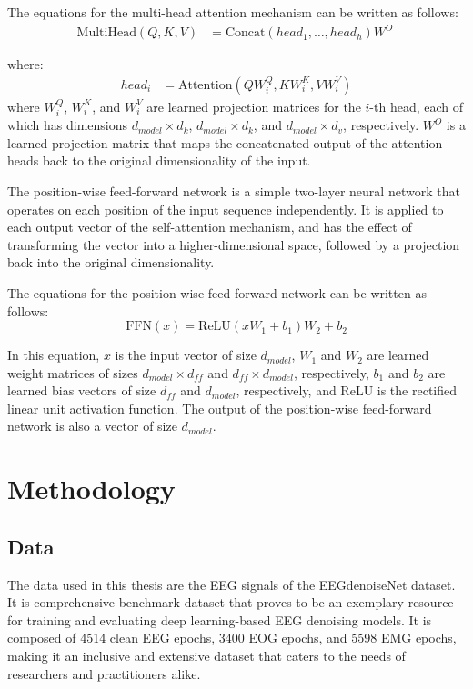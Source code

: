 \documentclass[a4paper]{sapthesis}
\begin{document}
 The equations for the multi-head attention mechanism can be written as 
 follows:
 \begin{align*}
 \text{MultiHead}(Q,K,V) &= \text{Concat}(head_1,\ldots,head_h)W^O \
\end{align*}

where:
 \begin{align*}
   head_i &= \text{Attention}(QW_i^Q, KW_i^K, VW_i^V)
 \end{align*}
 where $W_i^Q$, $W_i^K$, and $W_i^V$ are learned projection matrices for
  the $i$-th head, each of which has dimensions $d_{model}\times d_k$,
   $d_{model}\times d_k$, and $d_{model}\times d_v$, respectively.
    $W^O$ is a learned projection matrix that maps the concatenated
 output of the attention heads back to the original dimensionality of
  the input.\newline
 
The position-wise feed-forward network is a simple two-layer neural 
network that operates on each position of the input sequence 
independently. It is applied to each output vector of the self-attention
 mechanism, and has the effect of transforming the vector into a 
 higher-dimensional space, followed by a projection back into the
  original dimensionality.\newline

The equations for the position-wise feed-forward network can be written
 as follows:
 $$\text{FFN}(x) = \text{ReLU}(xW_1+b_1)W_2+b_2$$

 In this equation, $x$ is the input vector of size $d_{model}$,
  $W_1$ and $W_2$ are learned weight matrices of sizes 
  $d_{model}\times d_{ff}$ and $d_{ff}\times d_{model}$,
respectively, $b_1$ and $b_2$ are learned bias vectors of
size $d_{ff}$ and $d_{model}$, respectively, and ReLU is the
rectified linear unit activation function. The output of the
position-wise feed-forward network is also a vector of size $d_{model}$.
\chapter{Methodology}
\section{Data}\label{sec:data}
The data used in this thesis are the EEG signals of the EEGdenoiseNet 
dataset\cite{EEGdenoiseNet}. It is comprehensive benchmark dataset
 that proves to be an exemplary resource for training and evaluating
  deep learning-based EEG denoising models. It is composed of 4514 clean 
  EEG epochs, 3400 EOG epochs, and 5598 EMG epochs, making it an inclusive 
  and extensive dataset that caters to the needs of researchers and
 practitioners alike.
\end{document}
